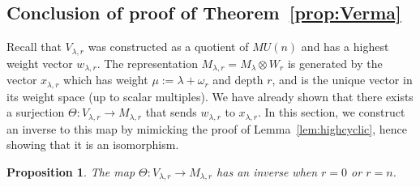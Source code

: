 \documentclass{amsart}
\numberwithin{equation}{section}
\theoremstyle{theorem}
\newtheorem{proposition}[theorem]{Proposition}
\theoremstyle{definition}
\begin{document}
\subsection{Conclusion of proof of Theorem~\ref{prop:Verma}\label{sec:proof-Verma}}
Recall that %
$V_{\lambda,r}$ was constructed as a quotient of %
$MU(n)$ and has a highest weight vector $ w_{\lambda, r}$. The representation $M_{\lambda, r}=M_{\lambda}\otimes W_r$ is generated by the vector $x_{\lambda, r}$ which has weight $\mu:=\lambda+\omega_r$ and depth $r$, and is the unique vector in its weight space (up to scalar multiples). We have already shown that
there exists a surjection $\Theta:V_{\lambda,r} \to M_{\lambda,r}$ that sends $w_{\lambda, r}$ to $x_{\lambda, r}$. In this section, we construct an inverse to this map by mimicking the proof of Lemma~\ref{lem:highcyclic}, hence showing that it is an isomorphism.

\begin{proposition}
The map $\Theta:V_{\lambda,r} \to M_{\lambda,r}$ has an inverse %
when $r=0$ or $r=n$.
\end{proposition}
\end{document}
